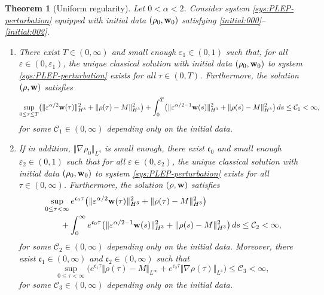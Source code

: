 \documentclass[10pt,a4paper]{amsart}
\newtheorem{theorem}{Theorem}
\newcommand{\norm}[2]{\Vert #1 \Vert_{#2}}
\renewcommand{\vec}[1]{{\bf #1}}
\begin{document}
\begin{theorem}[Uniform regularity]
    \label{thm:uniform}
    Let $ 0 < \alpha < 2 $.
    Consider system \eqref{sys:PLEP-perturbation} equipped with initial data $ (\rho_0, \vec w_0) $ satisfying \eqref{initial:000}--\eqref{initial:002}. 
    \begin{enumerate}[label = (\roman*), ref= \ref{thm:uniform} (\roman*)]
        \item \label{thm:uniform-1} There exist $ T \in (0,\infty) $ and small enough $ \varepsilon_1 \in (0,1) $ such that, for all $ \varepsilon \in (0,\varepsilon_1) $, the unique classical solution with initial data $ (\rho_0, \vec w_0) $ to system \eqref{sys:PLEP-perturbation} exists for all $ \tau \in (0,T) $. Furthermore, the solution $ (\rho, \vec w) $ satisfies
        \begin{equation}
            \label{est:thm-01}
            \sup_{0\leq \tau \leq T} \bigl( \norm{\varepsilon^{\alpha/2} \vec w(\tau)}{H^3}^2 + \norm{\rho(\tau)-M}{H^3}^2 \bigr) + \int_0^T \bigl( \norm{\varepsilon^{\alpha/2-1}\vec w(s)}{H^3}^2 + \norm{\rho(s)-M}{H^3}^2 \bigr) \,ds \leq \mathcal C_1 < \infty,  
        \end{equation}
        for some $ \mathcal C_1 \in (0,\infty) $ depending only on the initial data. 

        \item \label{thm:uniform-2} If in addition, $ \norm{\nabla \rho_0}{L^4} $ is small enough, there exist $ \mathfrak c_0 $ and small enough $ \varepsilon_2 \in (0,1) $ such that for all $ \varepsilon \in (0,\varepsilon_2) $, the unique classical solution with initial data $ (\rho_0, \vec w_0) $ to system \eqref{sys:PLEP-perturbation} exists for all $ \tau \in (0,\infty) $. Furthermore, the solution $ (\rho, \vec w) $ satisfies
        \begin{equation}
            \label{est:thm-02}
            \begin{aligned}
                & \sup_{0\leq \tau < \infty}  e^{\mathfrak c_0 \tau}  \bigl( \norm{\varepsilon^{\alpha/2} \vec w(\tau)}{H^3}^2 + \norm{\rho(\tau)-M}{H^3}^2  \bigr)  \\
                & \qquad + \int_0^\infty e^{\mathfrak c_0 \tau} \bigl( \norm{\varepsilon^{\alpha/2-1} \vec w(s)}{H^3}^2 + \norm{\rho(s)-M}{H^3}^2  \bigr) \,ds \leq \mathcal C_2 < \infty,
            \end{aligned}
        \end{equation}
        for some $ \mathcal C_2 \in (0,\infty) $ depending only on the initial data. Moreover, there exist $ \mathfrak c_1 \in (0,\infty) $ and $ \mathfrak c_2 \in (0,\infty)$ such that
        \begin{equation}
            \sup_{0\leq \tau < \infty} \bigl( e^{\mathfrak c_1 \tau} \norm{\rho(\tau)-M}{L^\infty} + e^{\mathfrak c_2 \tau} \norm{\nabla\rho(\tau)}{L^4} \bigr) \leq \mathcal C_3 < \infty, 
        \end{equation}
        for some $ \mathcal C_3 \in (0,\infty) $ depending only on the initial data. 
    \end{enumerate}
    
    
\end{theorem}
\end{document}
